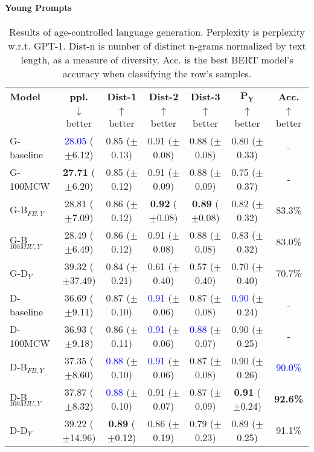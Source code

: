 \paragraph{Young Prompts}

\begin{table*}[h]
    \centering
    \begin{tabular}{l | c c c c | c c}
    \toprule
    \textbf{Model} & \textbf{ppl.} & \textbf{Dist-1} & \textbf{Dist-2} & \textbf{Dist-3} & $\boldsymbol{\bar{P}_Y}$ & \textbf{Acc.}\\
     & $\downarrow$ better & $\uparrow$ better & $\uparrow$ better & $\uparrow$ better & $\uparrow$ better & $\uparrow$ better\\
    \midrule
    \midrule
    G-baseline & \textcolor{blue}{28.05} ($\pm$6.12) & 0.85 ($\pm$0.13) & 0.91 ($\pm$0.08) & 0.88 ($\pm$0.08) & 0.80 ($\pm$0.33) & -\\
    G-100MCW & \textbf{27.71} ($\pm$6.20) & 0.85 ($\pm$0.12) & 0.91 ($\pm$0.09) & 0.88 ($\pm$0.09) & 0.75 ($\pm$0.37) & -\\
    \midrule
    G-B$_{FB, Y}$ & 28.81 ($\pm$7.09) & 0.86 ($\pm$0.12) & \textbf{0.92} ($\pm$0.08) & \textbf{0.89} ($\pm$0.08) & 0.82 ($\pm$0.32) & 83.3\%\\
    G-B$_{100MIU, Y}$ & 28.49 ($\pm$6.49) & 0.86 ($\pm$0.12) & 0.91 ($\pm$0.08) & 0.88 ($\pm$0.08) & 0.83 ($\pm$0.32) & 83.0\%\\
    \midrule
    G-D$_{Y}$ & 39.32 ($\pm$37.49) & 0.84 ($\pm$0.21) & 0.61 ($\pm$0.40) & 0.57 ($\pm$0.40) & 0.70 ($\pm$0.40) & 70.7\%\\
    \midrule
    \midrule
    D-baseline & 36.69 ($\pm$9.11) & 0.87 ($\pm$0.10) & \textcolor{blue}{0.91} ($\pm$0.06) & 0.87 ($\pm$0.08) & \textcolor{blue}{0.90} ($\pm$0.24) & -\\
    D-100MCW & 36.93 ($\pm$9.18) & 0.86 ($\pm$0.11) & \textcolor{blue}{0.91} ($\pm$0.06) & \textcolor{blue}{0.88} ($\pm$0.07) & 0.90 ($\pm$0.25) & -\\
    \midrule
    D-B$_{FB, Y}$ & 37.35 ($\pm$8.60) & \textcolor{blue}{0.88} ($\pm$0.10) & \textcolor{blue}{0.91} ($\pm$0.06) & 0.87 ($\pm$0.08) & 0.90 ($\pm$0.26) & \textcolor{blue}{90.0\%}\\
    D-B$_{100MIU, Y}$ & 37.87 ($\pm$8.32) & \textcolor{blue}{0.88} ($\pm$0.10) & 0.91 ($\pm$0.07) & 0.87 ($\pm$0.09) & \textbf{0.91} ($\pm$0.24) & \textbf{92.6\%}\\
    \midrule
    D-D$_{Y}$ & 39.22 ($\pm$14.96) & \textbf{0.89} ($\pm$0.12) & 0.86 ($\pm$0.19) & 0.79 ($\pm$0.23) & 0.89 ($\pm$0.25) & 91.1\%\\
    \bottomrule
    \end{tabular}
    \caption{ Results of age-controlled language generation. Perplexity is perplexity w.r.t. GPT-1. Dist-n is number of distinct n-grams normalized by text length, as a measure of diversity. Acc. is the best BERT model's accuracy when classifying the row's samples.}
    \label{tab:ctg_results_ws_young_prompt_young_model}
\end{table*}

